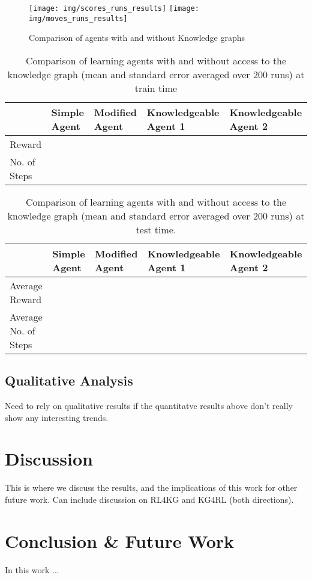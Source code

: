 \documentclass[letterpaper]{article} \usepackage{aaai20}  \usepackage{times}  \usepackage{helvet} \usepackage{courier}  \usepackage[hyphens]{url}  \usepackage{graphicx} \urlstyle{rm} \def\UrlFont{\rm}  \usepackage{graphicx}  \frenchspacing  \setlength{\pdfpagewidth}{8.5in}  \setlength{\pdfpageheight}{11in}
\begin{document}
\begin{figure*}[ht]
    \centering
    \texttt{[image: img/scores\_runs\_results]}
    \texttt{[image: img/moves\_runs\_results]}
    \caption{Comparison of agents with and without Knowledge graphs}
    \label{fig:scores}
\end{figure*}





\begin{table*}[h]
\centering
\begin{tabular}{lllll} 
\toprule
                     & Simple Agent & Modified Agent & Knowledgeable Agent 1 & Knowledgeable Agent 2   \\ 
\hline
Reward       &  &   &  & \\
No. of Steps &  &   &  & \\
\bottomrule
\end{tabular}
\caption{Comparison of learning agents with and without access to the knowledge graph (mean and standard error averaged over 200 runs) at train time}
\end{table*}




\begin{table*}[h]
\centering
\begin{tabular}{lllll} 
\toprule
                     & Simple Agent & Modified Agent & Knowledgeable Agent 1 & Knowledgeable Agent 2   \\ 
\hline
Average Reward       &  &   &  & \\
Average No. of Steps &  &   &  & \\
\bottomrule
\end{tabular}
\caption{Comparison of learning agents with and without access to the knowledge graph (mean and standard error averaged over 200 runs) at test time.}
\end{table*}


\subsection{Qualitative Analysis}

Need to rely on qualitative results if the quantitatve results above don't really show any interesting trends.


\section{Discussion}

This is where we discuss the results, and the implications of this work for other future work. Can include discussion on RL4KG and KG4RL (both directions). 


\section{Conclusion \& Future Work}

In this work ...

{


}
\end{document}

